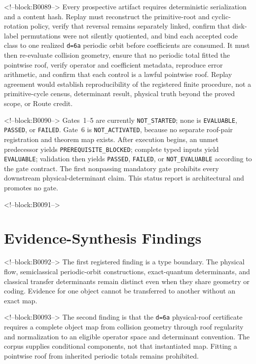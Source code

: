 \documentclass[11pt,a4paper]{article}
\begin{document}
<!--block:B0089-->
Every prospective artifact requires deterministic serialization and a content hash. Replay must reconstruct the primitive-root and cyclic-rotation policy, verify that reversal remains separately linked, confirm that disk-label permutations were not silently quotiented, and bind each accepted code class to one realized \texttt{d=6a} periodic orbit before coefficients are consumed. It must then re-evaluate collision geometry, ensure that no periodic total fitted the pointwise roof, verify operator and coefficient metadata, reproduce error arithmetic, and confirm that each control is a lawful pointwise roof. Replay agreement would establish reproducibility of the registered finite procedure, not a primitive-cycle census, determinant result, physical truth beyond the proved scope, or Route credit.

<!--block:B0090-->
Gates~1--5 are currently \texttt{NOT\_\allowbreak STARTED}; none is
\texttt{EVALUABLE}, \texttt{PASSED}, or \texttt{FAILED}.  Gate~6 is
\texttt{NOT\_\allowbreak ACTIVATED}, because no separate roof-pair registration and theorem
map exists.  After execution begins, an unmet predecessor yields
\texttt{PREREQUISITE\_\allowbreak BLOCKED}; complete typed inputs yield
\texttt{EVALUABLE}; validation then yields \texttt{PASSED},
\texttt{FAILED}, or \texttt{NOT\_\allowbreak EVALUABLE} according to the gate contract.
The first nonpassing mandatory gate prohibits every downstream
physical-determinant claim.  This status report is architectural and promotes
no gate.

<!--block:B0091-->
\section{Evidence-Synthesis Findings}

<!--block:B0092-->
The first registered finding is a type boundary. The physical flow, semiclassical periodic-orbit constructions, exact-quantum determinants, and classical transfer determinants remain distinct even when they share geometry or coding. Evidence for one object cannot be transferred to another without an exact map.

<!--block:B0093-->
The second finding is that the \texttt{d=6a} physical-roof certificate requires a complete object map from collision geometry through roof regularity and normalization to an eligible operator space and determinant convention. The corpus supplies conditional components, not that instantiated map. Fitting a pointwise roof from inherited periodic totals remains prohibited.
\end{document}
